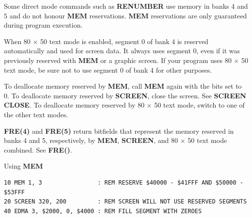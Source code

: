\begin{description}[leftmargin=2cm,style=nextline]
                  Some direct mode commands such as {\bf RENUMBER} use memory in banks 4 and 5 and do not honour {\bf MEM} reservations. {\bf MEM} reservations are only guaranteed during program execution.

                  When 80 $\times$ 50 text mode is enabled, segment 0 of bank 4 is reserved automatically and used for screen data. It always uses segment 0, even if it was previously reserved with {\bf MEM} or a graphic screen. If your program uses 80 $\times$ 50 text mode, be sure not to use segment 0 of bank 4 for other purposes.

                  To deallocate memory reserved by {\bf MEM}, call {\bf MEM} again with the bits set to 0. To deallocate memory reserved by {\bf SCREEN}, close the screen. See {\bf SCREEN CLOSE}. To deallocate memory reserved by 80 $\times$ 50 text mode, switch to one of the other text modes.

                  {\bf FRE(4)} and {\bf FRE(5)} return bitfields that represent the memory reserved in banks 4 and 5, respectively, by {\bf MEM}, {\bf SCREEN}, and 80 $\times$ 50 text mode combined. See {\bf FRE()}.

\item [Example:]  Using {\bf MEM}

\begin{tcolorbox}[colback=black,coltext=white]
\verbatimfont{\codefont}
\begin{verbatim}
10 MEM 1, 3                : REM RESERVE $40000 - $41FFF AND $50000 - $53FFF
20 SCREEN 320, 200         : REM SCREEN WILL NOT USE RESERVED SEGMENTS
40 EDMA 3, $2000, 0, $4000 : REM FILL SEGMENT WITH ZEROES
\end{verbatim}
\end{tcolorbox}
\end{description}


\newpage
